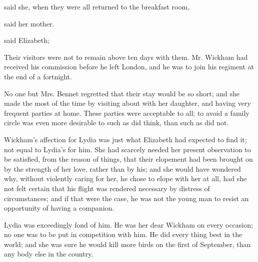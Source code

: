  said she, when they were all returned to the breakfast room, 



 said her mother.


 said Elizabeth; 

Their visitors were not to remain above ten days with them. Mr. Wickham had received his commission before he left London, and he was to join his regiment at the end of a fortnight.

No one but Mrs. Bennet regretted that their stay would be so short; and she made the most of the time by visiting about with her daughter, and having very frequent parties at home. These parties were acceptable to all; to avoid a family circle was even more desirable to such as did think, than such as did not.

Wickham's affection for Lydia was just what Elizabeth had expected to find it; not equal to Lydia's for him. She had scarcely needed her present observation to be satisfied, from the reason of things, that their elopement had been brought on by the strength of her love, rather than by his; and she would have wondered why, without violently caring for her, he chose to elope with her at all, had she not felt certain that his flight was rendered necessary by distress of circumstances; and if that were the case, he was not the young man to resist an opportunity of having a companion.

Lydia was exceedingly fond of him. He was her dear Wickham on every occasion; no one was to be put in competition with him. He did every thing best in the world; and she was sure he would kill more birds on the first of September, than any body else in the country.


